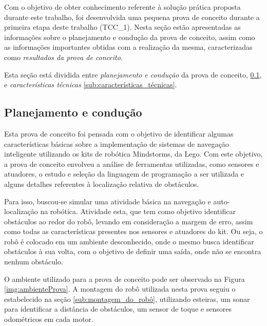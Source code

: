 
	Com o objetivo de obter conhecimento referente à solução prática proposta durante este trabalho, foi desenvolvida uma pequena prova de conceito durante a primeira etapa deste trabalho (TCC\_1). Nesta seção estão apresentadas as informações sobre o planejamento e condução da prova de conceito, assim como as informações importantes obtidas com a realização da mesma, caracterizadas como \textit{resultados da prova de conceito}.

	Esta seção está dividida entre \textit{planejamento e condução} da prova de conceito, \ref{sub:planejamento_e_condução}, e \textit{características técnicas} \ref{sub:características_técnicas}.

	\subsection{Planejamento e condução} %
	\label{sub:planejamento_e_condução}

		Esta prova de conceito foi pensada com o objetivo de identificar algumas características básicas sobre a implementação de sistemas de navegação inteligente utilizando os kits de robótica Mindstorms, da Lego. Com este objetivo, a prova de conceito envolveu a análise de ferramentas utilizadas, como sensores e atuadores, o estudo e seleção da linguagem de programação a ser utilizada e alguns detalhes referentes à localização relativa de obstáculos.

		Para isso, buscou-se simular uma atividade básica na navegação e auto-localização na robótica. Atividade esta, que tem como objetivo identificar obstáculos ao redor do robô, levando em consideração a margem de erro, assim como todas as características presentes nos sensores e atuadores do kit. Ou seja, o robô é colocado em um ambiente desconhecido, onde o mesmo busca identificar obstáculos à sua volta, com o objetivo de definir uma saída, onde não se encontra nenhum obstáculo.

		O ambiente utilizado para a prova de conceito pode ser observado na Figura \ref{img:ambienteProva}. A montagem do robô utilizada nesta prova seguiu o estabelecido na seção \ref{sub:montagem_do_robô}, utilizando esteiras, um sonar para identificar a distância de obstáculos, um sensor de toque e sensores odométricos em cada motor.

